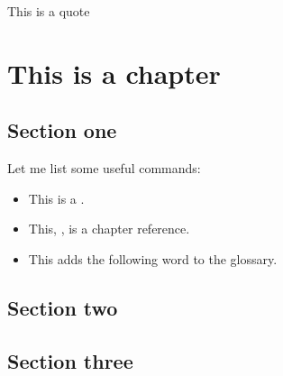 
\begin{savequote}[75mm]
This is a quote
\end{savequote}

\chapter{This is a chapter}\label{ch:chapter_reference}

	\lipsum[1-2]
	
	\newpage
	
	\section{Section one}\label{sec:section_one_reference}
	
		Let me list some useful commands:
		\begin{itemize}
			\item This is a .
			\item This, , is a chapter reference.
			\item This adds the following \gls{word} to the glossary.
		\end{itemize}
		
	
	\section{Section two}\label{sec:section_two_reference}
	
	\section{Section three}\label{sec:section_three_reference}